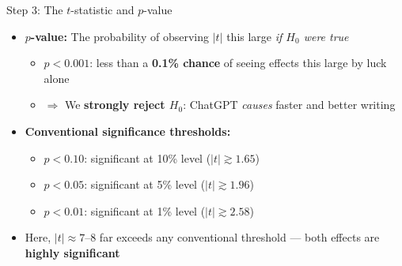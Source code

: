 \documentclass[hyperref={pdfpagelabels=false}]{beamer}
\begin{document}
	\begin{frame}{Step 3: The $t$-statistic and $p$-value}
		\begin{itemize}
			\item \textbf{$p$-value:} The probability of observing $|t|$ this large \emph{if $H_0$ were true}
			\vspace{0.3cm}
			\begin{itemize}
				\item $p < 0.001$: less than a \textbf{0.1\% chance} of seeing effects this large by luck alone
				\vspace{0.2cm}
				\item $\Rightarrow$ We \textbf{strongly reject $H_0$}: ChatGPT \emph{causes} faster and better writing
			\end{itemize}
			\vspace{0.4cm}
			\item \textbf{Conventional significance thresholds:}
			\vspace{0.2cm}
			\begin{itemize}
				\item $p < 0.10$: significant at 10\% level \quad ($|t| \gtrsim 1.65$)
				\vspace{0.1cm}
				\item $p < 0.05$: significant at 5\% level \quad ($|t| \gtrsim 1.96$)
				\vspace{0.1cm}
				\item $p < 0.01$: significant at 1\% level \quad ($|t| \gtrsim 2.58$)
			\end{itemize}
			\vspace{0.3cm}
			\item Here, $|t| \approx 7$--$8$ far exceeds any conventional threshold --- both effects are \textbf{highly significant}
		\end{itemize}
	\end{frame}
	
\end{document}

